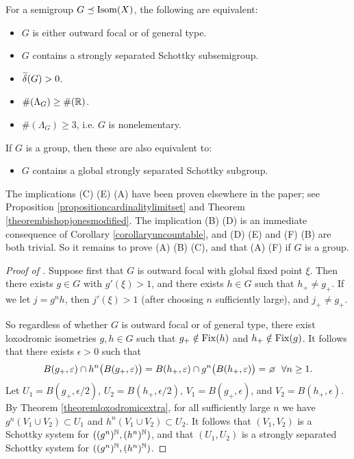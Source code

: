 \begin{proposition}
\label{propositionnonelementaryequivalent}
For a semigroup $G\preceq\operatorname{Isom}(X)$, the following are equivalent:
\begin{itemize}
\item[(A)] $G$ is either outward focal or of general type.
\item[(B)] $G$ contains a strongly separated Schottky subsemigroup.
\item[(C)] $\widetilde\delta(G) > 0$.
\item[(D)] $\#(\Lambda_G) \geq \#(\R)$.
\item[(E)] $\#(\Lambda_G) \geq 3$, i.e. $G$ is nonelementary.
\end{itemize}
If $G$ is a group, then these are also equivalent to:
\begin{itemize}
\item[(F)] $G$ contains a global strongly separated Schottky subgroup.
\end{itemize}
\end{proposition}
The implications (C) \implies (E) \implies (A) have been proven elsewhere in the paper; see Proposition \ref{propositioncardinalitylimitset} and Theorem \ref{theorembishopjonesmodified}. The implication (B) \implies (D) is an immediate consequence of Corollary \ref{corollaryuncountable}, and (D) \implies (E) and (F) \implies (B) are both trivial. So it remains to prove (A) \implies (B) \implies (C), and that (A) \implies (F) if $G$ is a group.
\begin{proof}[Proof of ]
Suppose first that $G$ is outward focal with global fixed point $\xi$. Then there exists $g\in G$ with $g'(\xi) > 1$, and there exists $h\in G$ such that $h_+ \neq g_+$. If we let $j = g^n h$, then $j'(\xi) > 1$ (after choosing $n$ sufficiently large), and $j_+ \neq g_+$.

So regardless of whether $G$ is outward focal or of general type, there exist loxodromic isometries $g,h\in G$ such that $g_+ \notin \operatorname{Fix}(h)$ and $h_+\notin\operatorname{Fix}(g)$. It follows that there exists $\epsilon > 0$ such that
\[
B(g_+,\epsilon) \cap h^n\big(B(g_+,\epsilon)\big) = B(h_+,\epsilon) \cap g^n\big(B(h_+,\epsilon)\big) = \emptyset \all n\geq 1.
\]
Let $U_1 = B(g_+,\epsilon/2)$, $U_2 = B(h_+,\epsilon/2)$, $V_1 = B(g_+,\epsilon)$, and $V_2 = B(h_+,\epsilon)$. By Theorem \ref{theoremloxodromicextra}, for all sufficiently large $n$ we have $g^n(V_1\cup V_2) \subset U_1$ and $h^n(V_1\cup V_2) \subset U_2$. It follows that $(V_1,V_2)$ is a Schottky system for $((g^n)^\N,(h^n)^\N)$, and that $(U_1,U_2)$ is a strongly separated Schottky system for $((g^n)^\N,(h^n)^\N)$.
\end{proof}
